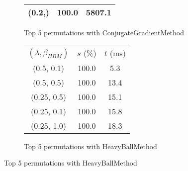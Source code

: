\begin{figure}[H]
\begin{subfigure}[ht]{.5\textwidth}
\begin{tabular}{|c|c|c|}
(0.2,) & 100.0 & 5807.1 \\
\hline
\end{tabular}
\caption{Top 5 permutations with ConjugateGradientMethod}
\label{subfig:param_comp_NegativeEntropy_ConjugateGradientMethod_ConstantSearch}
\end{subfigure}
\hfill
\begin{subfigure}[ht]{.5\textwidth}
\begin{tabular}{|c|c|c|}
\hline
\rowcolor{gray!25}
\multicolumn{3}{|c|}{HeavyBallMethod} \\
\hline
\rowcolor{gray!25}
$(\lambda,\beta_{HBM})$ & $s$ (\%) & $t$ (ms) \\
\hline
(0.5, 0.1) & 100.0 & 5.3 \\
(0.5, 0.5) & 100.0 & 13.4 \\
(0.25, 0.5) & 100.0 & 15.1 \\
(0.25, 0.1) & 100.0 & 15.8 \\
(0.25, 1.0) & 100.0 & 18.3 \\
\hline
\end{tabular}
\caption{Top 5 permutations with HeavyBallMethod}
\label{subfig:param_comp_NegativeEntropy_HeavyBallMethod_ConstantSearch}
\end{subfigure}
\end{figure}